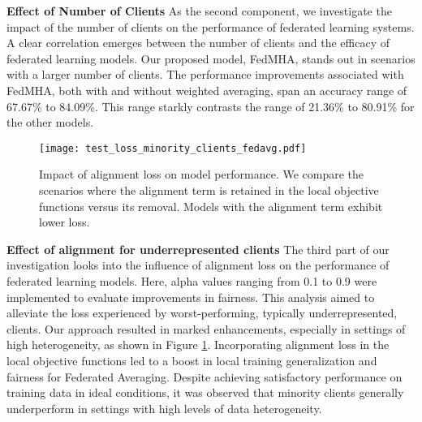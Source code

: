 \textbf{Effect of Number of Clients} As the second component, we investigate the impact of the number of clients on the performance of federated learning systems. A clear correlation emerges between the number of clients and the efficacy of federated learning models. Our proposed model, FedMHA, stands out in scenarios with a larger number of clients.  The performance improvements associated with FedMHA, both with and without weighted averaging, span an accuracy range of 67.67\% to 84.09\%. This range starkly contrasts the range of 21.36\% to 80.91\% for the other models.

\begin{figure}[htbp]
    \centering
\texttt{[image: test\_loss\_minority\_clients\_fedavg.pdf]}
    \caption{Impact of alignment loss on model performance. We compare the scenarios where the alignment term is retained in the local objective functions versus its removal. Models with the alignment term exhibit lower loss.}
\label{fig:Minority_loss_with_without_MHA}
\end{figure}
\textbf{Effect of alignment for underrepresented clients} The third part of our investigation looks into the influence of alignment loss on the performance of federated learning models. Here, alpha values ranging from 0.1 to 0.9 were implemented to evaluate improvements in fairness. This analysis aimed to alleviate the loss experienced by worst-performing, typically underrepresented, clients. Our approach resulted in marked enhancements, especially in settings of high heterogeneity, as shown in Figure \ref{fig:Minority_loss_with_without_MHA}. Incorporating alignment loss in the local objective functions led to a boost in local training generalization and fairness for Federated Averaging. Despite achieving satisfactory performance on training data in ideal conditions, it was observed that minority clients generally underperform in settings with high levels of data heterogeneity.
 

  






